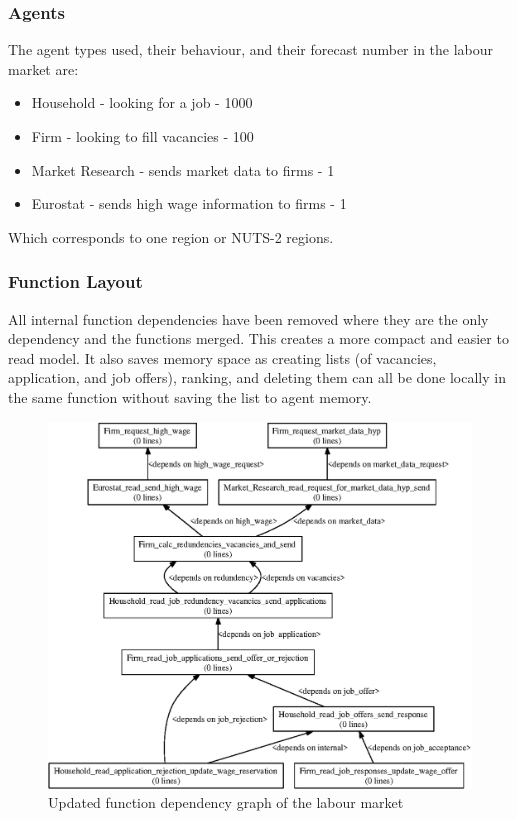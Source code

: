 \documentclass[a4paper,11pt]{article}
\begin{document}
\subsubsection{Agents}

The agent types used, their behaviour, and their forecast number in the labour market are:
\begin{itemize}
\item Household - looking for a job - 1000
    \item Firm - looking to fill vacancies - 100
    \item Market Research - sends market data to firms - 1
\item Eurostat - sends high wage information to firms - 1
\end{itemize}
Which corresponds to one region or NUTS-2 regions.

\subsubsection{Function Layout}

All internal function dependencies have been removed where they are
the only dependency and the functions merged. This creates a more
compact and easier to read model. It also saves memory space as
creating lists (of vacancies, application, and job offers), ranking,
and deleting them can all be done locally in the same function
without saving the list to agent memory.
\begin{figure}
\begin{center}
\includegraphics*[width=\linewidth]{labour_market_0.1_dgraph.eps}
\caption{Updated function dependency graph of the labour market} \label{fig:xalm}
\end{center}
\end{figure}
\end{document}
